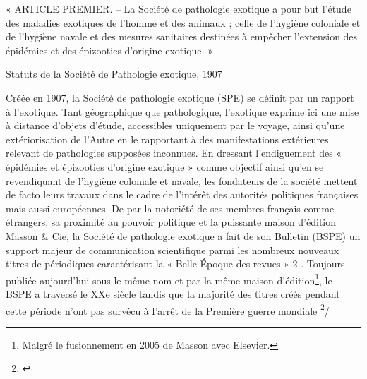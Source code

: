 \begin{changemargin}{5cm}{0cm} 
« ARTICLE PREMIER. – La Société de pathologie exotique a pour but l’étude des maladies exotiques de l’homme et des animaux ; celle de l’hygiène coloniale et de l’hygiène navale et des mesures sanitaires destinées à empêcher l’extension des épidémies et des épizooties d’origine exotique. »
\end{changemargin}
\begin{flushright}
\small
Statuts de la Société de Pathologie exotique, 1907
\end{flushright}

Créée en 1907, la Société de pathologie exotique (SPE) se définit par un rapport à l’exotique. Tant géographique que pathologique, l’exotique exprime ici une mise à distance d’objets d’étude, accessibles uniquement par le voyage, ainsi qu’une extériorisation de l’Autre en le rapportant à des manifestations extérieures relevant de pathologies supposées inconnues. En dressant l’endiguement des « épidémies et épizooties d’origine exotique » comme objectif ainsi qu’en se revendiquant de l’hygiène coloniale et navale, les fondateurs de la société mettent de facto leurs travaux dans le cadre de l’intérêt des autorités politiques françaises mais aussi européennes. 
De par la notoriété de ses membres français comme étrangers, sa proximité au pouvoir politique et la puissante maison d’édition Masson \& Cie, la Société de pathologie exotique a fait de son Bulletin (BSPE) un support majeur de communication scientifique parmi les nombreux nouveaux titres de périodiques caractérisant la « Belle Époque des revues » 2 . Toujours publiée aujourd’hui sous le même nom et par la même maison d’édition\footnote{Malgré le fusionnement en 2005 de Masson avec Elsevier.}, le BSPE a traversé le XXe siècle tandis que la majorité des titres créés pendant cette période n'ont pas survécu à l'arrêt de la Première guerre mondiale \footnote{\cite{tesniere_les_2014}}/ 


